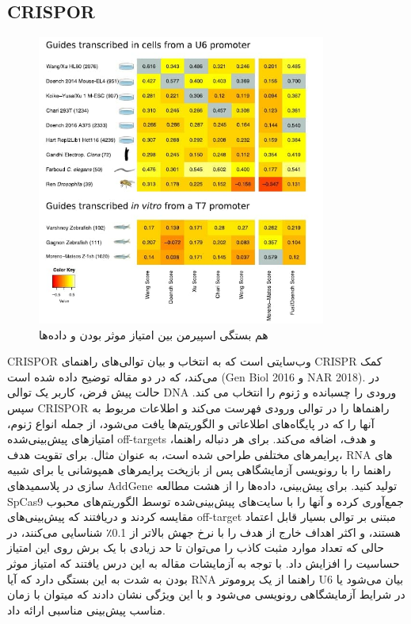 \documentclass[12pt,a4paper,BCOR=.7cm,headsepline,bibliography=totoc]{report}
\begin{document}
\subsection{CRISPOR}
\begin{figure}
\centering
\includegraphics[width=9.5cm, ]{pictures/CRISPOR.jpg}
\caption{
هم بستگی اسپیرمن بین امتیاز موثر بودن و داده‌ها	
}\label{wrap-fig:4}
\end{figure}
CRISPOR
 وب‌سایتی است که به انتخاب و بیان توالی‌های راهنمای CRISPR کمک می‌کند، که در دو مقاله توضیح داده شده است (Gen Biol 2016 و NAR 2018). در حالت پیش فرض، کاربر یک توالی DNA ورودی را چسبانده و ژنوم را انتخاب می کند. سپس CRISPOR راهنماها را در توالی ورودی فهرست می‌کند و اطلاعات مربوط به آنها را که در پایگاه‌های اطلاعاتی و الگوریتم‌ها یافت می‌شود، از جمله انواع ژنوم، امتیازهای پیش‌بینی‌شده off-targets و هدف، اضافه می‌کند. برای هر دنباله راهنما، پرایمرهای مختلفی طراحی شده است، به عنوان مثال. برای تقویت هدف، RNA های راهنما را با رونویسی آزمایشگاهی پس از بازپخت پرایمرهای همپوشانی یا برای شبیه سازی در پلاسمیدهای AddGene تولید کنید.
برای پیش‌بینی، داده‌ها را از هشت مطالعه  SpCas9 جمع‌آوری کرده و آنها را با سایت‌های پیش‌بینی‌شده توسط الگوریتم‌های محبوب مقایسه کردند و دریافتند که پیش‌بینی‌های off-target مبتنی بر توالی بسیار قابل اعتماد هستند، و اکثر اهداف خارج از هدف را با نرخ جهش بالاتر از 0.1٪ شناسایی می‌کنند، در حالی که تعداد موارد مثبت کاذب را می‌توان تا حد زیادی با یک برش روی این امتیاز حساسیت را افزایش داد. با توجه به آزمایشات مقاله به این درس یافتند که امتیاز موثر بودن به شدت به این بستگی دارد که آیا RNA راهنما از یک پروموتر U6 بیان می‌شود یا در شرایط آزمایشگاهی رونویسی می‌شود و با این ویژگی نشان دادند که میتوان با زمان مناسب پیش‌بینی مناسبی ارائه داد.
\end{document}
